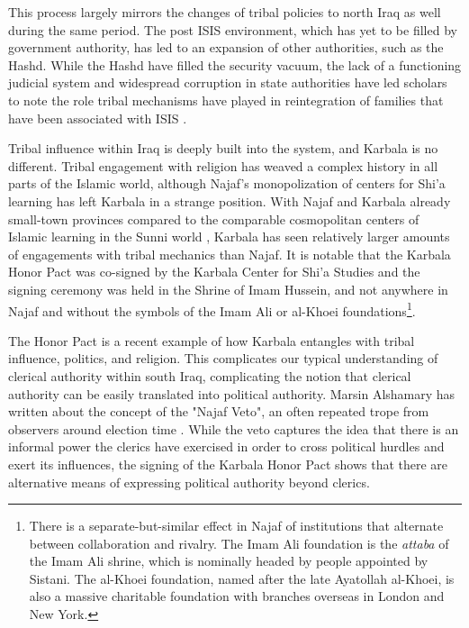 This process largely mirrors the changes of tribal policies to north Iraq as well during the same period. The post ISIS environment, which has yet to be filled by government authority, has led to an expansion of other authorities, such as the Hashd. While the Hashd have filled the security vacuum, the lack of a functioning judicial system and widespread corruption in state authorities have led scholars to note the role tribal mechanisms have played in reintegration of families that have been associated with ISIS \cite{genat_state_2023}.

Tribal influence within Iraq is deeply built into the system, and Karbala is no different. Tribal engagement with religion has weaved a complex history in all parts of the Islamic world, although Najaf's monopolization of centers for Shi'a learning has left Karbala in a strange position. With Najaf and Karbala already small-town provinces compared to the comparable cosmopolitan centers of Islamic learning in the Sunni world \cite{litvak_shii_2002}, Karbala has seen relatively larger amounts of engagements with tribal mechanics than Najaf. It is notable that the Karbala Honor Pact was co-signed by the Karbala Center for Shi'a Studies and the signing ceremony was held in the Shrine of Imam Hussein, and not anywhere in Najaf and without the symbols of the Imam Ali or al-Khoei foundations\footnote{There is a separate-but-similar effect in Najaf of institutions that alternate between collaboration and rivalry. The Imam Ali foundation is the \emph{attaba} of the Imam Ali shrine, which is nominally headed by people appointed by Sistani. The al-Khoei foundation, named after the late Ayatollah al-Khoei, is also a massive charitable foundation with branches overseas in London and New York.}. 


The Honor Pact is a recent example of how Karbala entangles with tribal influence, politics, and religion. This complicates our typical understanding of clerical authority within south Iraq, complicating the notion that clerical authority can be easily translated into political authority. Marsin Alshamary has written about the concept of the "Najaf Veto", an often repeated trope from observers around election time \cite{alshamary_shia_2022}. While the veto captures the idea that there is an informal power the clerics have exercised in order to cross political hurdles and exert its influences, the signing of the Karbala Honor Pact shows that there are alternative means of expressing political authority beyond clerics. 

